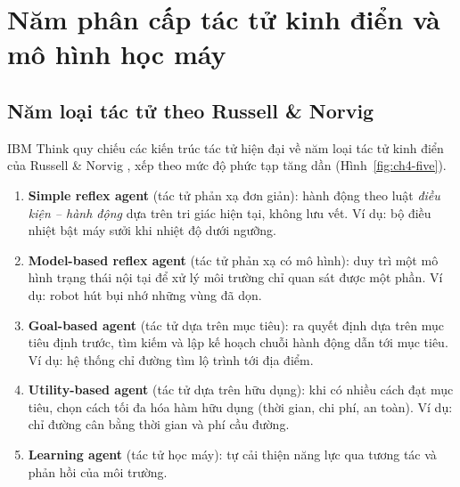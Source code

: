 \chapter{Năm phân cấp tác tử kinh điển và mô hình học máy}

\section{Năm loại tác tử theo Russell \& Norvig}
IBM Think \cite{ibm_agents} quy chiếu các kiến trúc tác tử hiện đại về năm loại tác tử kinh điển của Russell \& Norvig
\cite{russell_norvig}, xếp theo mức độ phức tạp tăng dần (Hình~\ref{fig:ch4-five}).
\begin{enumerate}
  \item \textbf{Simple reflex agent} (tác tử phản xạ đơn giản): hành động theo luật \emph{điều kiện -- hành động} dựa
        trên tri giác hiện tại, không lưu vết. Ví dụ: bộ điều nhiệt bật máy sưởi khi nhiệt độ dưới ngưỡng.
  \item \textbf{Model-based reflex agent} (tác tử phản xạ có mô hình): duy trì một mô hình trạng thái nội tại để xử lý
        môi trường chỉ quan sát được một phần. Ví dụ: robot hút bụi nhớ những vùng đã dọn.
  \item \textbf{Goal-based agent} (tác tử dựa trên mục tiêu): ra quyết định dựa trên mục tiêu định trước, tìm kiếm và lập
        kế hoạch chuỗi hành động dẫn tới mục tiêu. Ví dụ: hệ thống chỉ đường tìm lộ trình tới địa điểm.
  \item \textbf{Utility-based agent} (tác tử dựa trên hữu dụng): khi có nhiều cách đạt mục tiêu, chọn cách tối đa hóa hàm
        hữu dụng (thời gian, chi phí, an toàn). Ví dụ: chỉ đường cân bằng thời gian và phí cầu đường.
  \item \textbf{Learning agent} (tác tử học máy): tự cải thiện năng lực qua tương tác và phản hồi của môi trường.
\end{enumerate}


